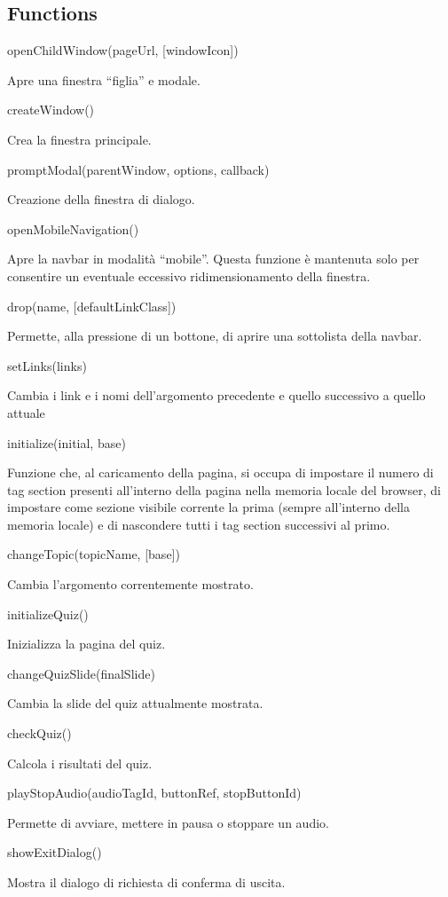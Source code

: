 \hypertarget{functions-1}{%
\subsection{Functions}\label{functions-1}}

openChildWindow(pageUrl, {[}windowIcon{]})

Apre una finestra ``figlia'' e modale.

createWindow()

Crea la finestra principale.

promptModal(parentWindow, options, callback)

Creazione della finestra di dialogo.

openMobileNavigation()

Apre la navbar in modalità ``mobile''. Questa funzione è mantenuta solo
per consentire un eventuale eccessivo ridimensionamento della finestra.

drop(name, {[}defaultLinkClass{]})

Permette, alla pressione di un bottone, di aprire una sottolista della
navbar.

setLinks(links)

Cambia i link e i nomi dell'argomento precedente e quello successivo a
quello attuale

initialize(initial, base)

Funzione che, al caricamento della pagina, si occupa di impostare il
numero di tag section presenti all'interno della pagina nella memoria
locale del browser, di impostare come sezione visibile corrente la prima
(sempre all'interno della memoria locale) e di nascondere tutti i tag
section successivi al primo.

changeTopic(topicName, {[}base{]})

Cambia l'argomento correntemente mostrato.

initializeQuiz()

Inizializza la pagina del quiz.

changeQuizSlide(finalSlide)

Cambia la slide del quiz attualmente mostrata.

checkQuiz()

Calcola i risultati del quiz.

playStopAudio(audioTagId, buttonRef, stopButtonId)

Permette di avviare, mettere in pausa o stoppare un audio.

showExitDialog()

Mostra il dialogo di richiesta di conferma di uscita.

